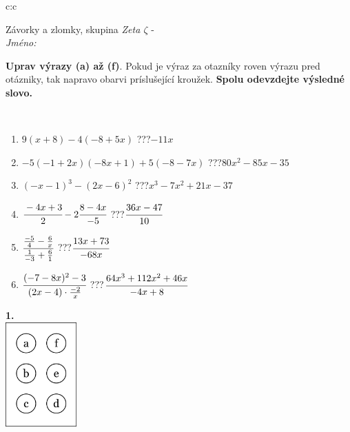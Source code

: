 \documentclass[10pt]{report}
\begin{document}
\begin{tabular}{c:c}
\begin{minipage}[c][104.5mm][t]{0.5\linewidth}
\begin{center}
\vspace{7mm}
{\huge Závorky a zlomky, skupina \textit{Zeta $\zeta$} -}\\[5mm]
\textit{Jméno:}\phantom{xxxxxxxxxxxxxxxxxxxxxxxxxxxxxxxxxxxxxxxxxxxxxxxxxxxxxxxxxxxxxxxxx}\\[5mm]
\begin{minipage}{0.95\linewidth}
\begin{center}
\textbf{Uprav výrazy (a) až (f)}. Pokud je výraz za otazníky roven výrazu pred otázniky, tak napravo obarvi príslušející kroužek. \textbf{Spolu odevzdejte výsledné slovo.}
\end{center}
\end{minipage}
\\[1mm]
\begin{minipage}{0.79\linewidth}
\begin{center}
\begin{varwidth}{\linewidth}
\begin{enumerate}
\normalsize
\item $9(x+8)-4(-8+5x)$\quad \dotfill\; ???\;\dotfill \quad $-11x$
\item $-5(-1+2x)(-8x+1)+5(-8-7x)$\quad \dotfill\; ???\;\dotfill \quad $80x^2-85x-35$
\item $(-x-1)^3-(2x-6)^2$\quad \dotfill\; ???\;\dotfill \quad $x^3-7x^2+21x-37$
\item $\cfrac{-4x+3}{2}-2\cfrac{8-4x}{-5}$\quad \dotfill\; ???\;\dotfill \quad $\cfrac{36x-47}{10}$
\item $\cfrac{\frac{-5}{4}-\frac{6}{x}}{\frac{1}{-3}+\frac{6}{1}}$\quad \dotfill\; ???\;\dotfill \quad $\cfrac{13x+73}{-68x}$
\item $\cfrac{(-7-8x)^2-3}{(2x-4)\cdot\frac{-2}{x}}$\quad \dotfill\; ???\;\dotfill \quad $\cfrac{64x^3+112x^2+46x}{-4x+8}$
\end{enumerate}
\end{varwidth}
\end{center}
\end{minipage}
\begin{minipage}{0.20\linewidth}
\begin{center}
{\Huge\bfseries 1.} \\[2mm]
\includegraphics[height=40mm]{../images/braille.png}

\end{center}
\end{minipage}
\end{center}
\end{minipage}
\end{tabular}
\end{document}
